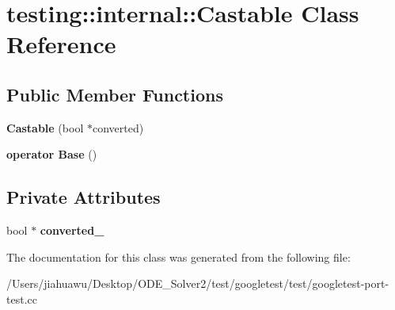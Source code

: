 \hypertarget{classtesting_1_1internal_1_1_castable}{}\section{testing\+:\+:internal\+:\+:Castable Class Reference}
\label{classtesting_1_1internal_1_1_castable}
\subsection*{Public Member Functions}
\begin{DoxyCompactItemize}
\item 
\mbox{\label{classtesting_1_1internal_1_1_castable_a705d519a227d38ff5c174905316f62c4}} 
{\bfseries Castable} (bool $\ast$converted)
\item 
\mbox{\label{classtesting_1_1internal_1_1_castable_ac60b2e7885f3b09defb829eddaa0afd9}} 
{\bfseries operator Base} ()
\end{DoxyCompactItemize}
\subsection*{Private Attributes}
\begin{DoxyCompactItemize}
\item 
\mbox{\label{classtesting_1_1internal_1_1_castable_a25aef3122ad03813a44bb3d40190b490}} 
bool $\ast$ {\bfseries converted\+\_\+}
\end{DoxyCompactItemize}


The documentation for this class was generated from the following file\+:\begin{DoxyCompactItemize}
\item 
/\+Users/jiahuawu/\+Desktop/\+O\+D\+E\+\_\+\+Solver2/test/googletest/test/googletest-\/port-\/test.\+cc\end{DoxyCompactItemize}
